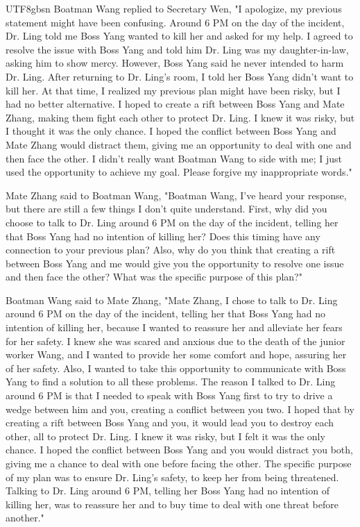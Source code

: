 \documentclass[11pt]{article}
\begin{document}
{\begin{CJK}{UTF8}{gbsn}
Boatman Wang replied to Secretary Wen, "I apologize, my previous statement might have been confusing. Around 6 PM on the day of the incident, Dr. Ling told me Boss Yang wanted to kill her and asked for my help. I agreed to resolve the issue with Boss Yang and told him Dr. Ling was my daughter-in-law, asking him to show mercy. However, Boss Yang said he never intended to harm Dr. Ling. After returning to Dr. Ling's room, I told her Boss Yang didn't want to kill her. At that time, I realized my previous plan might have been risky, but I had no better alternative. I hoped to create a rift between Boss Yang and Mate Zhang, making them fight each other to protect Dr. Ling. I knew it was risky, but I thought it was the only chance. I hoped the conflict between Boss Yang and Mate Zhang would distract them, giving me an opportunity to deal with one and then face the other. I didn't really want Boatman Wang to side with me; I just used the opportunity to achieve my goal. Please forgive my inappropriate words."

Mate Zhang said to Boatman Wang, "Boatman Wang, I've heard your response, but there are still a few things I don't quite understand. First, why did you choose to talk to Dr. Ling around 6 PM on the day of the incident, telling her that Boss Yang had no intention of killing her? Does this timing have any connection to your previous plan? Also, why do you think that creating a rift between Boss Yang and me would give you the opportunity to resolve one issue and then face the other? What was the specific purpose of this plan?"

Boatman Wang said to Mate Zhang, "Mate Zhang, I chose to talk to Dr. Ling around 6 PM on the day of the incident, telling her that Boss Yang had no intention of killing her, because I wanted to reassure her and alleviate her fears for her safety. I knew she was scared and anxious due to the death of the junior worker Wang, and I wanted to provide her some comfort and hope, assuring her of her safety. Also, I wanted to take this opportunity to communicate with Boss Yang to find a solution to all these problems. The reason I talked to Dr. Ling around 6 PM is that I needed to speak with Boss Yang first to try to drive a wedge between him and you, creating a conflict between you two. I hoped that by creating a rift between Boss Yang and you, it would lead you to destroy each other, all to protect Dr. Ling. I knew it was risky, but I felt it was the only chance. I hoped the conflict between Boss Yang and you would distract you both, giving me a chance to deal with one before facing the other. The specific purpose of my plan was to ensure Dr. Ling's safety, to keep her from being threatened. Talking to Dr. Ling around 6 PM, telling her Boss Yang had no intention of killing her, was to reassure her and to buy time to deal with one threat before another."


\end{CJK}}
\end{document}
